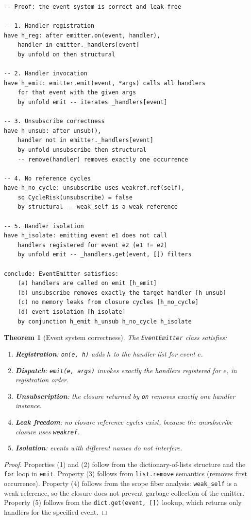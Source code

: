 \documentclass[11pt,a4paper]{report}
\theoremstyle{definition}
\theoremstyle{plain}
\newtheorem{theorem}[definition]{Theorem}
\begin{document}
\begin{lstlisting}[style=proof]
-- Proof: the event system is correct and leak-free

-- 1. Handler registration
have h_reg: after emitter.on(event, handler),
    handler in emitter._handlers[event]
    by unfold on then structural

-- 2. Handler invocation
have h_emit: emitter.emit(event, *args) calls all handlers
    for that event with the given args
    by unfold emit -- iterates _handlers[event]

-- 3. Unsubscribe correctness
have h_unsub: after unsub(),
    handler not in emitter._handlers[event]
    by unfold unsubscribe then structural
    -- remove(handler) removes exactly one occurrence

-- 4. No reference cycles
have h_no_cycle: unsubscribe uses weakref.ref(self),
    so CycleRisk(unsubscribe) = false
    by structural -- weak_self is a weak reference

-- 5. Handler isolation
have h_isolate: emitting event e1 does not call
    handlers registered for event e2 (e1 != e2)
    by unfold emit -- _handlers.get(event, []) filters

conclude: EventEmitter satisfies:
    (a) handlers are called on emit [h_emit]
    (b) unsubscribe removes exactly the target handler [h_unsub]
    (c) no memory leaks from closure cycles [h_no_cycle]
    (d) event isolation [h_isolate]
    by conjunction h_emit h_unsub h_no_cycle h_isolate
\end{lstlisting}

\begin{theorem}[Event system correctness]
The \texttt{EventEmitter} class satisfies:
\begin{enumerate}
  \item \textbf{Registration}: \texttt{on(e, h)} adds $h$ to the handler
    list for event $e$.
  \item \textbf{Dispatch}: \texttt{emit(e, args)} invokes exactly the
    handlers registered for $e$, in registration order.
  \item \textbf{Unsubscription}: the closure returned by \texttt{on}
    removes exactly one handler instance.
  \item \textbf{Leak freedom}: no closure reference cycles exist,
    because the unsubscribe closure uses \texttt{weakref}.
  \item \textbf{Isolation}: events with different names do not interfere.
\end{enumerate}
\end{theorem}
\begin{proof}
Properties (1) and (2) follow from the dictionary-of-lists structure
and the \texttt{for} loop in \texttt{emit}.
Property (3) follows from \texttt{list.remove} semantics (removes first
occurrence).
Property (4) follows from the scope fiber analysis: \texttt{weak\_self}
is a weak reference, so the closure does not prevent garbage collection
of the emitter.
Property (5) follows from the \texttt{dict.get(event, [])} lookup,
which returns only handlers for the specified event.
\end{proof}
\end{document}

